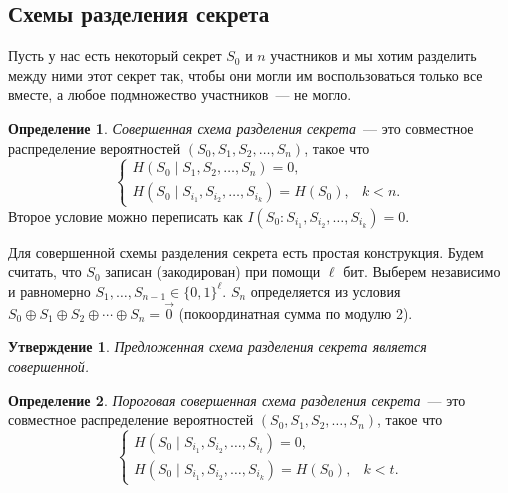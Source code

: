 \documentclass[12pt]{article}
\newcommand{\seqn}[2]{{#1}_1,{#1}_2,\dotsc,{#1}_{#2}}
\newcommand{\seqin}[3]{{#1}_{{#2}_1},{#1}_{{#2}_2},\dotsc,{#1}_{{#2}_{#3}}}
\theoremstyle{definition}
\newtheorem{definition}{Определение}
\theoremstyle{plain}
\newtheorem{statement}{Утверждение}[section]
\theoremstyle{remark}
\begin{document}
\subsection{Схемы разделения секрета}

Пусть у нас есть некоторый секрет $S_0$ и $n$ участников и мы хотим разделить между ними этот секрет
так, чтобы они могли им воспользоваться только все вместе, а любое подмножество участников~--- не
могло.
\begin{definition}
    \emph{Совершенная схема разделения секрета}~--- это совместное распределение вероятностей
    $(S_0,\seqn{S}{n})$, такое что
    \[
    \begin{cases}
        H(S_0\mid\seqn{S}{n}) = 0,\\
        H(S_0\mid\seqin{S}{i}{k}) = H(S_0), & k <  n.
    \end{cases}
    \]
    Второе условие можно переписать как $I(S_0:\seqin{S}{i}{k}) = 0$.
\end{definition}

Для совершенной схемы разделения секрета есть простая конструкция. Будем считать, что $S_0$
записан (закодирован) при помощи $\ell$ бит. Выберем независимо и равномерно
$S_1,\dotsc,S_{n-1}\in\{0,1\}^\ell$. $S_n$ определяется из условия 
$S_0 \oplus S_1 \oplus S_2 \oplus \dotsb \oplus S_n = \vec 0$ (покоординатная сумма по модулю 2).
\begin{statement}
    Предложенная схема разделения секрета является совершенной.
\end{statement}

\begin{definition}
    \emph{Пороговая совершенная схема разделения секрета}~--- это совместное распределение вероятностей
    $(S_0,\seqn{S}{n})$, такое что
    \[
    \begin{cases}
        H(S_0\mid\seqin{S}{i}{t}) = 0,\\
        H(S_0\mid\seqin{S}{i}{k}) = H(S_0), & k < t.
    \end{cases}
    \]
\end{definition}
\end{document}
